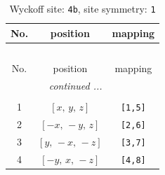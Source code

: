 \documentclass[fleqn,8pt]{jsarticle}
\begin{document}
\begin{longtable}{ccc}
\caption{Wyckoff site: {\tt 4b}, site symmetry: {\tt 1}}
 \\
 \hline \hline
No. & position & mapping \\ \hline \endfirsthead

\multicolumn{2}{l}{\tablename\ \thetable{}} \\
 \hline \hline
No. & position & mapping \\ \hline \endhead

 \hline \hline
\multicolumn{2}{r}{\footnotesize\it continued ...} \\ \endfoot

 \hline \hline
\multicolumn{2}{r}{} \\ \endlastfoot

1 & $\left[ x,\, y,\, z \right]$ & {\tt [1,5]} \\ \hline
2 & $\left[ - x,\, - y,\, z \right]$ & {\tt [2,6]} \\ \hline
3 & $\left[ y,\, - x,\, - z \right]$ & {\tt [3,7]} \\ \hline
4 & $\left[ - y,\, x,\, - z \right]$ & {\tt [4,8]} \\
\end{longtable}
\end{document}
